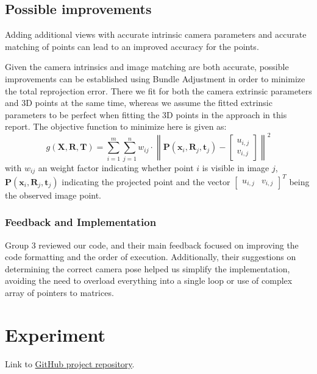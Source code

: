 \documentclass{article}
\begin{document}
\subsection{Possible improvements}
Adding additional views with accurate intrinsic camera parameters and accurate matching of points can lead to an improved accuracy for the points.

Given the camera intrinsics and image matching are both accurate, possible improvements can be established using Bundle Adjustment in order to minimize the total reprojection error. There we fit for both the camera extrinsic parameters and 3D points at the same time, whereas we assume the fitted extrinsic parameters to be perfect when fitting the 3D points in the approach in this report. The objective function to minimize here is given as:
\[
g(\mathbf{X}, \mathbf{R}, \mathbf{T}) = \sum_{i=1}^{m} \sum_{j=1}^{n} w_{ij} \cdot \left\| \mathbf{P}(\mathbf{x}_i, \mathbf{R}_j, \mathbf{t}_j) - \begin{bmatrix} u_{i,j} \\ v_{i,j} \end{bmatrix} \right\|^2
\]
with $w_{ij}$ an weight factor indicating whether point $i$ is visible in image $j$, $\mathbf{P}(\mathbf{x}_i, \mathbf{R}_j, \mathbf{t}_j)$ indicating the projected point  and the vector $\begin{bmatrix} u_{i,j} & v_{i,j} \end{bmatrix}^T$ being the observed image point.


\subsubsection{Feedback and Implementation}
Group 3 reviewed our code, and their main feedback focused on improving the code formatting and the order of execution. Additionally, their suggestions on determining the correct camera pose helped us simplify the implementation, avoiding the need to overload everything into a single loop or use of complex array of pointers to matrices.

\section{Experiment}
Link to \href{https://github.com/Jcsegertudelft/Geo1016Assignment2}{GitHub project repository}.
\end{document}

